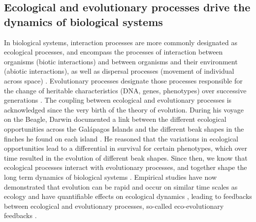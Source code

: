 \subsection{Ecological and evolutionary processes drive the dynamics of biological systems}
% 
%
% 
In biological systems, interaction processes are more commonly designated as ecological processes, and encompass the processes of interaction between organisms (biotic interactions) and between organisms and their environment (abiotic interactions), as well as dispersal processes (movement of individual across space) \citep{Vellend2010a}.
% 
Evolutionary processes designate those processes responsible for the change of heritable characteristics (DNA, genes, phenotypes) over successive generations \citep{Hall2013}.
% 
The coupling between ecological and evolutionary processes is acknowledged since the very birth of the theory of evolution. 
% 
During his voyage on the Beagle, Darwin documented a link between the different ecological opportunities across the Galápagos Islands and the different beak shapes in the finches he found on each island \citep{darwin2004origin}.
% 
He reasoned that the variations in ecological opportunities lead to a differential in survival for certain phenotypes, which over time resulted in the evolution of different beak shapes.
% 
Since then, we know that ecological processes interact with evolutionary processes, and together shape the long term dynamics of biological systems \citep{Rahbek2019a,Rangel2018,Hagen}.
% 
Empirical studies have now demonstrated that evolution can be rapid and occur on similar time scales as ecology \citep{Hairston2005, Pelletier2009} and have quantifiable effects on ecological dynamics \citep{Ezard2009}, leading to feedbacks between ecological and evolutionary processes, so-called eco-evolutionary feedbacks \citep{Pelletier2009,Schoener2011,Govaert2019}. 
